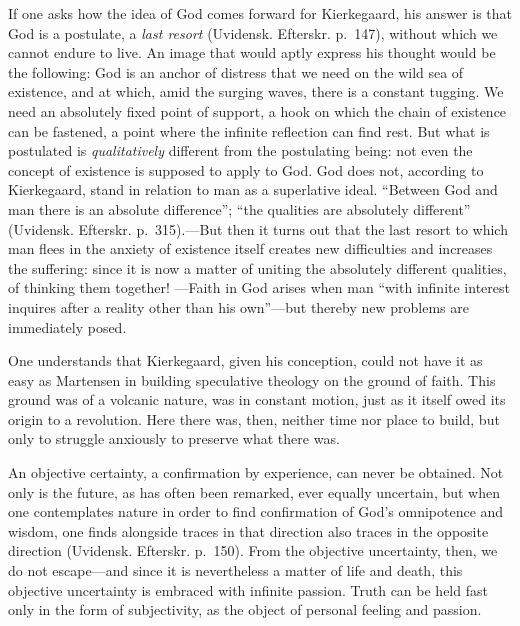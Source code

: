 \documentclass[12pt,a4paper]{book}
\newcommand{\opage}[1]{\marginnote{\footnotesize\textit{[#1]}}}
\begin{document}
If one asks how the idea of God comes forward for Kierkegaard, his answer
is that God is a postulate, a \textit{last resort} (Uvidensk. Efterskr.
p.~147), without which we cannot endure to live. An image that would
aptly express his thought would be the following: God is an anchor of
distress that we need on the wild sea of existence, and at which, amid
the surging waves, there is a constant tugging. We need an absolutely
fixed point of support, a hook on which the chain of existence can be
fastened, a point where the infinite reflection can find rest. But what
is postulated is \textit{qualitatively} different from the postulating
being: not even the concept of existence is supposed to apply to God.
God does not, according to Kierkegaard, stand in relation to man as a
superlative ideal. ``Between God and man there is an absolute
difference''; ``the qualities are absolutely different'' (Uvidensk.
Efterskr. p.~315).---But then it turns out that the last resort to which
man flees in the anxiety of existence itself creates new difficulties and
increases the suffering: since it is now a matter of uniting the
absolutely
\opage{67}different qualities, of thinking them together!
---Faith in God arises when man ``with infinite interest inquires after a
reality other than his own''---but thereby new problems are immediately
posed.

One understands that Kierkegaard, given his conception, could not have it
as easy as Martensen in building speculative theology on the ground of
faith. This ground was of a volcanic nature, was in constant motion, just
as it itself owed its origin to a revolution. Here there was, then,
neither time nor place to build, but only to struggle anxiously to
preserve what there was.

An objective certainty, a confirmation by experience, can never be
obtained. Not only is the future, as has often been remarked, ever
equally uncertain, but when one contemplates nature in order to find
confirmation of God's omnipotence and wisdom, one finds alongside traces
in that direction also traces in the opposite direction (Uvidensk.
Efterskr. p.~150). From the objective uncertainty, then, we do not
escape---and since it is nevertheless a matter of life and death, this
objective uncertainty is embraced with infinite passion. Truth can be
held fast only in the form of subjectivity, as the object of personal
feeling and passion.
\end{document}
